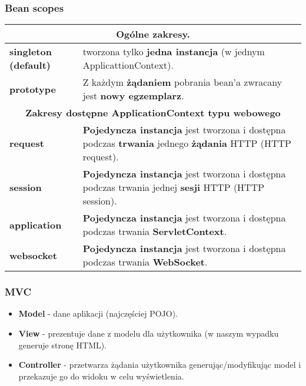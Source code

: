 \documentclass[../main.tex]{subfiles}
\begin{document}
    \subsubsection{Bean scopes}
    \begin{table}[H]
        \begin{center}
            \begin{tabular}{| p{3.5cm} | p{12.5cm} |}
                \hline
                \multicolumn{2}{|c|}{\textbf{Ogólne zakresy.}} \\
                \hline
                \textbf{singleton (default)} &
                tworzona tylko \textbf{jedna instancja} (w jednym ApplicattionContext). \\
                \hline
                \textbf{prototype} & Z każdym \textbf{żądaniem} pobrania bean'a zwracany jest
                \textbf{nowy egzemplarz}. \\
                \hline
                \hline
                \multicolumn{2}{|c|}{\textbf{Zakresy dostępne ApplicationContext typu webowego}}. \\
                \hline
                \textbf{request} & \textbf{Pojedyncza instancja} jest tworzona i dostępna podczas
                \textbf{trwania} jednego \textbf{żądania} HTTP (HTTP request). \\
                \hline
                \textbf{session} & \textbf{Pojedyncza instancja} jest tworzona i dostępna podczas
                trwania jednej \textbf{sesji} HTTP (HTTP session). \\
                \hline
                \textbf{application} & \textbf{Pojedyncza instancja} jest tworzona i dostępna podczas
                trwania \textbf{ServletContext}. \\
                \hline
                \textbf{websocket} & \textbf{Pojedyncza instancja} jest tworzona i dostępna podczas
                trwania \textbf{WebSocket}. \\
                \hline
            \end{tabular}
        \end{center}
    \end{table}

    \subsubsection{MVC}
    \begin{itemize}
        \item \textbf{Model} - dane aplikacji (najczęściej POJO).
        \item \textbf{View} - prezentuje dane z modelu dla użytkownika (w naszym wypadku generuje
        stronę HTML).
        \item \textbf{Controller} - przetwarza żądania użytkownika generując/modyfikując model i przekazuje
        go do widoku w celu wyświetlenia.
    \end{itemize}
\end{document}

